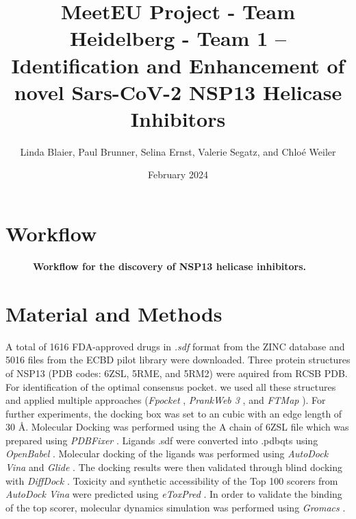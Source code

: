 \documentclass[11pt, letterpaper, titlepage]{article}
\title{MeetEU Project - Team Heidelberg - Team 1 -- \\ Identification and Enhancement of novel Sars-CoV-2 NSP13 Helicase Inhibitors}
\author{Linda Blaier, Paul Brunner, Selina Ernst, Valerie Segatz, and Chlo\'{e} Weiler}
\date{February 2024}
\renewcommand{\cite}{\parencite}
\begin{document}
\maketitle

\ihead{\headmark}
\cfoot{\pagemark}   %

\section{Workflow}

\begin{figure}[h]
  \centering
  \caption*{\textbf{Workflow for the discovery of NSP13 helicase inhibitors.}}
  \label{workflow}
\end{figure}

\setcounter{figure}{0}
\renewcommand{\thefigure}{\arabic{figure}}


\section{Material and Methods}
A total of 1616 FDA-approved drugs in \textit{.sdf} format from the ZINC database \cite{Irwin.2020} and 5016 files from the ECBD pilot library were downloaded.
Three protein structures of NSP13 (PDB codes: 6ZSL, 5RME, and 5RM2) were aquired from RCSB PDB. For identification of the optimal consensus pocket. we used all these structures and applied multiple approaches (\textit{Fpocket} \cite{package_Fpocket}, \textit{PrankWeb 3} \cite{package_P2Rank,package_PrankWeb,package_PrankWeb3}, and \textit{FTMap} \cite{package_FTMAP}). For further experiments, the docking box was set to an cubic with an edge length of 30 \AA. Molecular Docking was performed using the A chain of 6ZSL file which was prepared using \textit{PDBFixer} \cite{Eastman_2017}. Ligands .sdf were converted into .pdbqts using \textit{OpenBabel} \cite{OpenBabel}. Molecular docking of the ligands was performed using \textit{AutoDock Vina} \cite{Trott.2010} and \textit{Glide} \cite{Friesner2004}. The docking results were then validated through blind docking with \textit{DiffDock} \cite{Corso.2022}. Toxicity and synthetic accessibility of the Top 100 scorers from \textit{AutoDock Vina} were predicted using \textit{eToxPred} \cite{pu2019toxpred}.
In order to validate the binding of the top scorer, molecular dynamics simulation was performed using \textit{Gromacs} \cite{packageGROMACS}.\\
\end{document}
